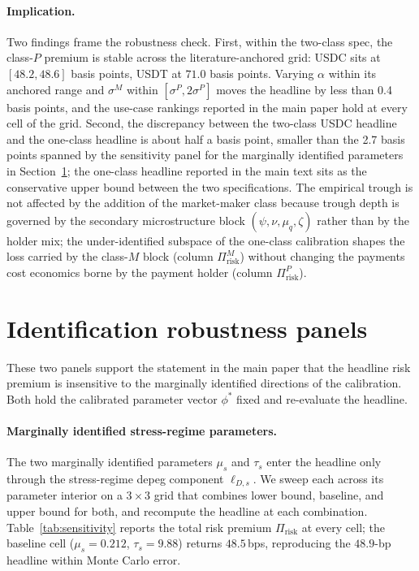 \paragraph{Implication.} Two findings frame the robustness check. First, within the two-class spec, the class-$P$ premium is stable across the literature-anchored grid: USDC sits at $[48.2, 48.6]$ basis points, USDT at $71.0$ basis points. Varying $\alpha$ within its anchored range and $\sigma^M$ within $[\sigma^P, 2 \sigma^P]$ moves the headline by less than 0.4 basis points, and the use-case rankings reported in the main paper hold at every cell of the grid. Second, the discrepancy between the two-class USDC headline and the one-class headline is about half a basis point, smaller than the 2.7 basis points spanned by the sensitivity panel for the marginally identified parameters in Section~\ref{ia:robustness_panels}; the one-class headline reported in the main text sits as the conservative upper bound between the two specifications. The empirical trough is not affected by the addition of the market-maker class because trough depth is governed by the secondary microstructure block $(\psi, \nu, \mu_q, \zeta)$ rather than by the holder mix; the under-identified subspace of the one-class calibration shapes the loss carried by the class-$M$ block (column $\Pi_{\text{risk}}^M$) without changing the payments cost economics borne by the payment holder (column $\Pi_{\text{risk}}^P$).

\section{Identification robustness panels}\label{ia:robustness_panels}

These two panels support the statement in the main paper that the headline risk premium is insensitive to the marginally identified directions of the calibration. Both hold the calibrated parameter vector $\phi^*$ fixed and re-evaluate the headline.

\paragraph{Marginally identified stress-regime parameters.} The two marginally identified parameters $\mu_s$ and $\tau_s$ enter the headline only through the stress-regime depeg component $\ell_{D,s}$. We sweep each across its parameter interior on a $3 \times 3$ grid that combines lower bound, baseline, and upper bound for both, and recompute the headline at each combination. Table~\ref{tab:sensitivity} reports the total risk premium $\Pi_{\text{risk}}$ at every cell; the baseline cell ($\mu_s=0.212$, $\tau_s=9.88$) returns $48.5$\,bps, reproducing the $48.9$-bp headline within Monte Carlo error.

